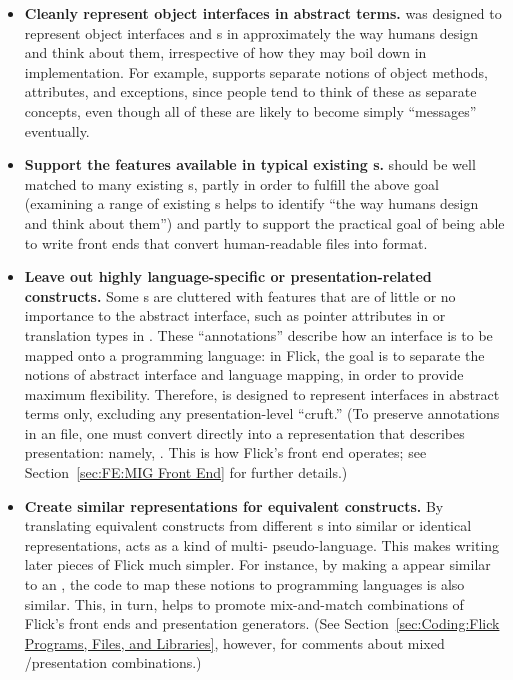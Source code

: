 \begin{itemize}
  \item \textbf{Cleanly represent object interfaces in abstract terms.}
  \AOI{} was designed to represent object interfaces and \IDL{}s in
  approximately the way humans design and think about them, irrespective of how
  they may boil down in implementation. For example, \AOI{} supports separate
  notions of object methods, attributes, and exceptions, since people tend to
  think of these as separate concepts, even though all of these are likely to
  become simply ``messages'' eventually.

  \item \textbf{Support the features available in typical existing \IDL{}s.}
  \AOI{} should be well matched to many existing \IDL{}s, partly in order to
  fulfill the above goal (examining a range of existing \IDL{}s helps to
  identify ``the way humans design and think about them'') and partly to
  support the practical goal of being able to write front ends that convert
  human-readable \IDL{} files into \AOI{} format.

  \item \textbf{Leave out highly language-specific or presentation-related
  constructs.}
  Some \IDL{}s are cluttered with features that are of little or no importance
  to the abstract \RPC{} interface, such as pointer attributes in \DCE{} or
  translation types in \MIG{}\@.  These ``annotations'' describe how an
  interface is to be mapped onto a programming language: in Flick, the goal is
  to separate the notions of abstract interface and language mapping, in order
  to provide maximum flexibility.  Therefore, \AOI{} is designed to represent
  interfaces in abstract terms only, excluding any presentation-level
  ``cruft.''  (To preserve annotations in an \IDL{} file, one must convert
  \IDL{} directly into a representation that describes presentation: namely,
  \PRESC{}\@.  This is how Flick's \MIG{} front end operates; see
  Section~\ref{sec:FE:MIG Front End} for further details.)

  \item \textbf{Create similar representations for equivalent \IDL{}
  constructs.}
  By translating equivalent constructs from different \IDL{}s into similar or
  identical \AOI{} representations, \AOI{} acts as a kind of multi-\IDL{}
  pseudo-language.  This makes writing later pieces of Flick much simpler.  For
  instance, by making a \CORBA{} \IDL{}  appear similar to an
  \ONCRPC{} \IDL{} , the code to map these notions to programming
  languages is also similar.  This, in turn, helps to promote mix-and-match
  combinations of Flick's front ends and presentation generators.  (See
  Section~\ref{sec:Coding:Flick Programs, Files, and Libraries}, however, for
  comments about mixed \IDL{}/presentation combinations.)
\end{itemize}

